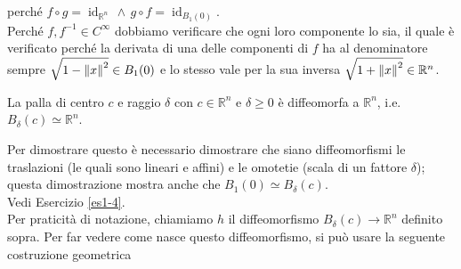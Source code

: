 perché $ f \circ g = \operatorname{id}_{\mathbb{R}^{n}} \, \wedge \, g \circ f = \operatorname{id}_{B_{1} (0)} $.\\
Perché $ f, f^{-1} \in C^{\infty} $ dobbiamo verificare che ogni loro componente lo sia, il quale è verificato perché la derivata di una delle componenti di $ f $ ha al denominatore sempre $ \sqrt{1 - \norm{x}^{2}} \in B_{1} (0) $ e lo stesso vale per la sua inversa $ \sqrt{1 + \norm{x}^{2}} \in \mathbb{R}^{n} $.

\begin{corollary}
	La palla di centro $ c $ e raggio $ \delta $ con $ c \in \mathbb{R}^{n} $ e $ \delta \geqslant 0 $ è diffeomorfa a $ \mathbb{R}^{n} $, i.e. $ B_{\delta} (c) \simeq \mathbb{R}^{n} $.
\end{corollary}

Per dimostrare questo è necessario dimostrare che siano diffeomorfismi le traslazioni (le quali sono lineari e affini) e le omotetie (scala di un fattore $ \delta $); questa dimostrazione mostra anche che $ B_{1} (0) \simeq B_{\delta} (c) $.\\
Vedi Esercizio \ref{es1-4}.\\
Per praticità di notazione, chiamiamo $ h $ il diffeomorfismo $ B_{\delta} (c) \to \mathbb{R}^{n} $ definito sopra. Per far vedere come nasce questo diffeomorfismo, si può usare la seguente costruzione geometrica

